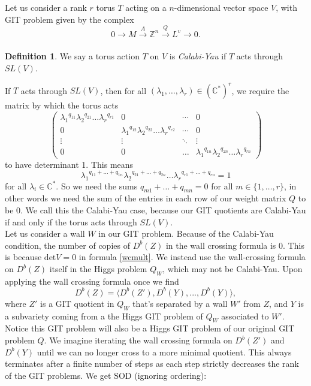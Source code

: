 \documentclass[oneside]{amsart}
\theoremstyle{definition}
\newtheorem{definition}{Definition}[section]
\theoremstyle{definition}
\theoremstyle{definition}
\theoremstyle{definition}
\newcommand{\CC}{\mathbb{C}}
\newcommand{\Z}{\mathbb{Z}}
\begin{document}
Let us consider a rank $r$ torus $T$ acting on a $n$-dimensional vector space $V$, with GIT problem given by the complex
$$
0 \xrightarrow[]{} M \xrightarrow[]{A} \Z^n \xrightarrow[]{Q} L^v \xrightarrow[]{} 0.
$$
\begin{definition}
    We say a torus action $T$ on $V$ is \textit{Calabi-Yau} if $T$ acts through $SL(V)$.
\end{definition}
If $T$ acts through $SL(V)$, then for all $(\lambda_1, \dots, \lambda_r) \in (\CC^*)^r$, we require the matrix by which the torus acts 
$$
\begin{pmatrix}
{\lambda_1}^{q_{11}}{\lambda_2}^{q_{21}}\dots {\lambda_r}^{q_{r1}} & 0 & \cdots & 0 \\
0 & {\lambda_1}^{q_{12}}{\lambda_2}^{q_{22}}\dots {\lambda_r}^{q_{r2}} & \cdots & 0 \\
\vdots & \vdots &  \ddots & \vdots \\
0 & 0 & \dots & {\lambda_1}^{q_{1n}}{\lambda_2}^{q_{2n}}\dots {\lambda_r}^{q_{rn}}
\end{pmatrix}
$$
to have determinant 1. This means
$$
{\lambda_1}^{q_{11} + \dots + q_{1n}} {\lambda_2}^{q_{21} + \dots + q_{2n}}
\dots {\lambda_r}^{q_{r1} + \dots + q_{rn}} = 1
$$
for all $\lambda_i \in \CC^*$. So we need the sums $q_{m1} + \dots + q_{mn} = 0$ for all $m \in \{1, \dots, r \}$, in other words we need the sum of the entries in each row of our weight matrix $Q$ to be 0. We call this the Calabi-Yau case, because our GIT quotients are Calabi-Yau if and only if the torus acts through $SL(V)$.\\
\newline
Let us consider a wall $W$ in our GIT problem. Because of the Calabi-Yau condition, the number of copies of $D^b(Z)$ in the wall crossing formula is 0. This is because $\text{det}V=0$ in formula \eqref{wcmult}. We instead use the wall-crossing formula on $D^b(Z)$ itself in the Higgs problem $Q_W$, which may not be Calabi-Yau. Upon applying the wall crossing formula once we find
$$
D^b(Z) = \langle D^b(Z'), D^b(Y),...,D^b(Y) \rangle,
$$
where $Z'$ is a GIT quotient in $Q_W$ that's separated by a wall $W'$ from $Z$, and $Y$ is a subvariety coming from a the Higgs GIT problem of $Q_W$ associated to $W'$. Notice this GIT problem will also be a Higgs GIT problem of our original GIT problem $Q$. We imagine iterating the wall crossing formula on $D^b(Z')$ and $D^b(Y)$ until we can no longer cross to a more minimal quotient. This always terminates after a finite number of steps as each step strictly decreases the rank of the GIT problems. We get SOD (ignoring ordering):
\end{document}
